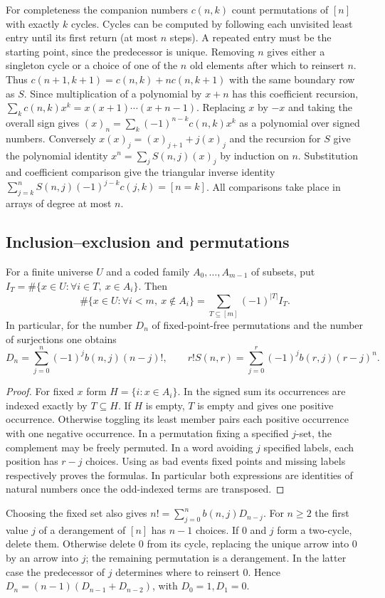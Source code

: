 For completeness the companion numbers $c(n,k)$ count permutations of
$[n]$ with exactly $k$ cycles. Cycles can be computed by following each
unvisited least entry until its first return (at most $n$ steps). A repeated
entry must be the starting point, since the predecessor is unique. Removing
$n$ gives either a singleton cycle or a choice of one of the $n$ old
elements after which to reinsert $n$. Thus
$c(n+1,k+1)=c(n,k)+n c(n,k+1)$ with the same boundary row as $S$.
Since multiplication of a polynomial by $x+n$ has this coefficient
recursion, $\sum_k c(n,k)x^k=x(x+1)\cdots(x+n-1)$.
Replacing $x$ by $-x$ and taking the overall sign gives
$(x)_n=\sum_k(-1)^{n-k}c(n,k)x^k$ as a polynomial over signed numbers.
Conversely $x(x)_j=(x)_{j+1}+j(x)_j$ and the recursion for $S$ give the
polynomial identity $x^n=\sum_jS(n,j)(x)_j$ by induction on $n$.
Substitution and coefficient comparison give the triangular inverse identity
$\sum_{j=k}^n S(n,j)(-1)^{j-k}c(j,k)=[n=k]$.
All comparisons take place in arrays of degree at most $n$.

\subsection{Inclusion--exclusion and permutations}
\begin{theorem}\label{result08}
For a finite universe $U$ and a coded family $A_0,\ldots,A_{m-1}$ of
subsets, put $I_T=\#\{x\in U:\forall i\in T,\ x\in A_i\}$. Then
\[
 \#\{x\in U:\forall i<m,\ x\notin A_i\}
 =\sum_{T\subseteq[m]}(-1)^{|T|}I_T .
\]
In particular, for the number $D_n$ of fixed-point-free permutations and
the number of surjections one obtains
\[
 D_n=\sum_{j=0}^n(-1)^j b(n,j)(n-j)!,
 \qquad r!S(n,r)=\sum_{j=0}^r(-1)^j b(r,j)(r-j)^n .
\]
\end{theorem}
\begin{proof}
For fixed $x$ form $H=\{i:x\in A_i\}$. In the signed sum its occurrences
are indexed exactly by $T\subseteq H$. If $H$ is empty, $T$ is empty and
gives one positive occurrence. Otherwise toggling its least member pairs
each positive occurrence with one negative occurrence. In a permutation
fixing a specified $j$-set, the complement may be freely permuted. In a
word avoiding $j$ specified labels, each position has $r-j$ choices.
Using as bad events fixed points and missing labels respectively proves the
formulas. In particular both expressions are identities of natural
numbers once the odd-indexed terms are transposed.
\end{proof}
Choosing the fixed set also gives $n!=\sum_{j=0}^n b(n,j)D_{n-j}$.
For $n\ge2$ the first value $j$ of a derangement of $[n]$ has $n-1$
choices. If $0$ and $j$ form a two-cycle, delete them. Otherwise delete
$0$ from its cycle, replacing the unique arrow into $0$ by an arrow into
$j$; the remaining permutation is a derangement. In the latter case the
predecessor of $j$ determines where to reinsert $0$. Hence
$D_n=(n-1)(D_{n-1}+D_{n-2})$, with $D_0=1,D_1=0$.

